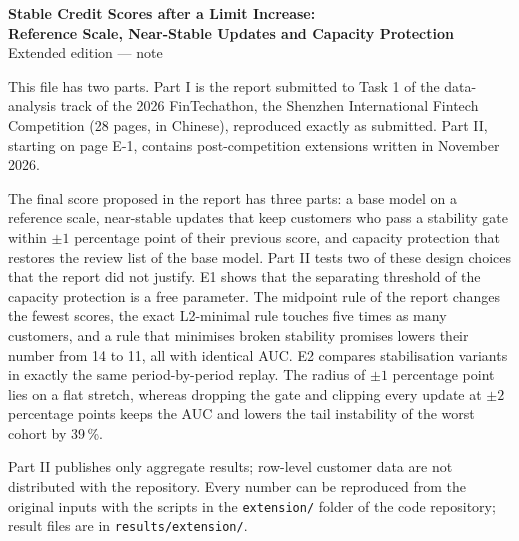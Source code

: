 
\graphicspath{{../../figures/extension/}}

\thispagestyle{empty}
\begin{center}
{\Large\bfseries Stable Credit Scores after a Limit Increase:\\[0.2em] Reference Scale, Near-Stable Updates and Capacity Protection}\\[0.7em]
{\large Extended edition --- note}
\end{center}
\vspace{0.8em}

This file has two parts. Part I is the report submitted to Task 1 of the data-analysis track of the 2026 FinTechathon, the Shenzhen International Fintech Competition (28 pages, in Chinese), reproduced exactly as submitted. Part II, starting on page E-1, contains post-competition extensions written in November 2026.

The final score proposed in the report has three parts: a base model on a reference scale, near-stable updates that keep customers who pass a stability gate within $\pm1$ percentage point of their previous score, and capacity protection that restores the review list of the base model. Part II tests two of these design choices that the report did not justify. E1 shows that the separating threshold of the capacity protection is a free parameter. The midpoint rule of the report changes the fewest scores, the exact L2-minimal rule touches five times as many customers, and a rule that minimises broken stability promises lowers their number from 14 to 11, all with identical AUC. E2 compares stabilisation variants in exactly the same period-by-period replay. The radius of $\pm1$ percentage point lies on a flat stretch, whereas dropping the gate and clipping every update at $\pm2$ percentage points keeps the AUC and lowers the tail instability of the worst cohort by 39\,\%.

Part II publishes only aggregate results; row-level customer data are not distributed with the repository. Every number can be reproduced from the original inputs with the scripts in the \texttt{extension/} folder of the code repository; result files are in \texttt{results/extension/}.

